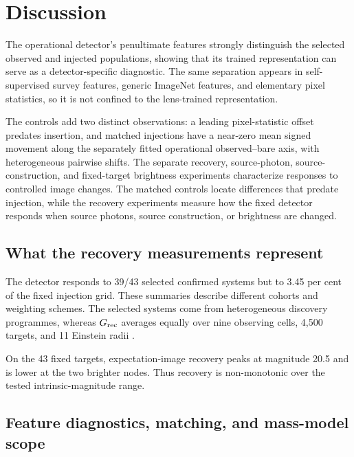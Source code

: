 \section{Discussion}
\label{sec:discussion}

The operational detector's penultimate features strongly distinguish the
selected observed and injected populations, showing that its trained
representation can serve as a detector-specific diagnostic. The same
separation appears in self-supervised survey features, generic ImageNet
features, and elementary pixel statistics, so it is not confined to the
lens-trained representation.

The controls add two distinct observations: a leading pixel-statistic offset
predates insertion, and matched injections have a near-zero mean signed
movement along the separately fitted operational observed--bare axis, with
heterogeneous pairwise shifts. The separate recovery, source-photon,
source-construction, and fixed-target brightness experiments characterize
responses to controlled image changes. The matched controls locate differences
that predate injection, while the recovery experiments measure how the fixed
detector responds when source photons, source construction, or brightness are
changed.

\subsection{What the recovery measurements represent}
\label{sec:discussion_recovery}

The detector responds to 39/43 selected confirmed systems but to 3.45 per cent
of the fixed injection grid. These summaries describe different cohorts and
weighting schemes. The selected systems come from heterogeneous discovery
programmes, whereas \(G_{\rm rec}\) averages equally over nine observing
cells, 4,500 targets, and 11 Einstein radii
\citep{Huang2020,Huang2021,Stein2022,Storfer2024,Sonnenfeld2023,Sonnenfeld2024}.

On the 43 fixed targets, expectation-image recovery peaks at magnitude 20.5
and is lower at the two brighter nodes. Thus recovery is non-monotonic over
the tested intrinsic-magnitude range.

\subsection{Feature diagnostics, matching, and mass-model scope}
\label{sec:discussion_deflector}

